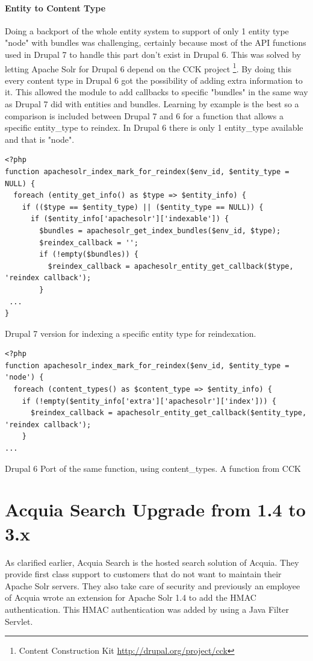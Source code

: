 \paragraph{Entity to Content Type}
Doing a backport of the whole entity system to support of only 1 entity type "node" with bundles was challenging, certainly because most of the API functions used in Drupal 7 to handle this part don't exist in Drupal 6. This was solved by letting Apache Solr for Drupal 6 depend on the CCK project \footnote{Content Construction Kit \url{http://drupal.org/project/cck}}. By doing this every content type in Drupal 6 got the possibility of adding extra information to it. This allowed the module to add callbacks to specific "bundles" in the same way as Drupal 7 did with entities and bundles. Learning by example is the best so a comparison is included between Drupal 7 and 6 for a function that allows a specific entity\_type to reindex. In Drupal 6 there is only 1 entity\_type available and that is "node".

\begin{verbatim}
<?php
function apachesolr_index_mark_for_reindex($env_id, $entity_type = NULL) {
  foreach (entity_get_info() as $type => $entity_info) {
    if (($type == $entity_type) || ($entity_type == NULL)) {
      if ($entity_info['apachesolr']['indexable']) {
        $bundles = apachesolr_get_index_bundles($env_id, $type);
        $reindex_callback = '';
        if (!empty($bundles)) {
          $reindex_callback = apachesolr_entity_get_callback($type, 'reindex callback');
        }
 ...
}\end{verbatim}
\caption{Drupal 7 version for indexing a specific entity type for reindexation.}

\begin{verbatim}
<?php
function apachesolr_index_mark_for_reindex($env_id, $entity_type = 'node') {
  foreach (content_types() as $content_type => $entity_info) {
    if (!empty($entity_info['extra']['apachesolr']['index'])) {
      $reindex_callback = apachesolr_entity_get_callback($entity_type, 'reindex callback');
    }
...
\end{verbatim}
\caption{Drupal 6 Port of the same function, using content\_types. A function from CCK}

\section{Acquia Search Upgrade from 1.4 to 3.x}
As clarified earlier, Acquia Search is the hosted search solution of Acquia. They provide first class support to customers that do not want to maintain their Apache Solr servers. They also take care of security and previously an employee of Acquia wrote an extension for Apache Solr 1.4 to add the HMAC authentication. This HMAC authentication was added by using a Java Filter Servlet.

